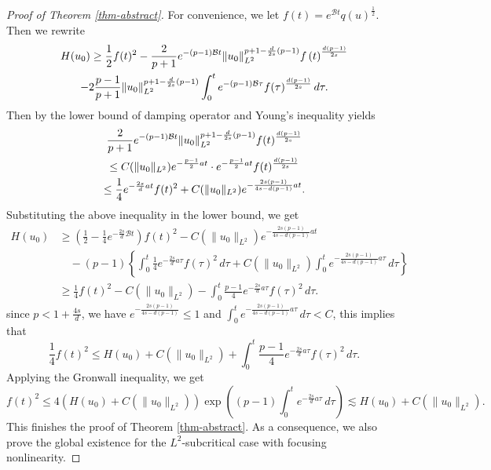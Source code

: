 \documentclass[10pt%
]{amsart}
\numberwithin{equation}{section}
\theoremstyle{definition}
\begin{document}
\begin{proof}[Proof of Theorem \ref{thm-abstract}]
	For convenience, we let $f(t)=e^{\mathcal Bt}q(u)^\frac{1}{2}$. Then we rewrite
	\begin{gather*}
		H(u_0) \geq \frac{1}{2} f(t)^2 - \frac{2}{p+1} e^{-(p-1)\mathcal Bt} \| u_0 \|_{L^2}^{p+1-\frac{d}{2s}(p-1)} f\left(t\right)^{\frac{d(p-1)}{2s}} \notag \\
		- 2\frac{p-1}{p+1} \| u_0 \|_{L^2}^{p+1-\frac{d}{2s}(p-1)} \int_0^t e^{-(p-1)\mathcal B\tau} f(\tau)^{\frac{d(p-1)}{2s}} \,d\tau.
	\end{gather*}
	Then by the lower bound of damping operator and  Young's inequality yields 
	\begin{gather*}
		\frac{2}{p+1} e^{-(p-1)\mathcal Bt} \|u_0\|_{L^2}^{p+1-\frac{d}{2s}(p-1)} f(t)^{\frac{d(p-1)}{2s}} \notag \\
		\leq C(\|u_0\|_{L^2}) e^{-\frac{p-1}{2}at} \cdot e^{-\frac{p-1}{2}at} f(t)^{\frac{d(p-1)}{2s}} \notag \\
		\leq \frac{1}{4} e^{-\frac{2s}{d}at} f(t)^2 + C(\|u_0\|_{L^2}) e^{-\frac{2s(p-1)}{4s-d(p-1)} at}.
	\end{gather*}
	Substituting the above inequality in the lower bound, we get
	\begin{align}
		H(u_0) &\geq \left( \frac{1}{2} - \frac{1}{4}e^{-\frac{2s}{d}\mathcal Bt} \right)f(t)^2 - C(\|u_0\|_{L^2})e^{-\frac{2s(p-1)}{4s-d(p-1)}at} \nonumber \\
		&\quad -(p-1)\left\{ \int_0^t \frac{1}{4}e^{-\frac{2s}{d}a \tau}f(\tau)^2\,d\tau + C(\|u_0\|_{L^2})\int_0^t e^{-\frac{2s(p-1)}{4s-d(p-1)}a\tau}\,d\tau \right\} \nonumber \\
		&\geq \frac{1}{4}f(t)^2 - C(\|u_0\|_{L^2}) - \int_0^t \frac{p-1}{4}e^{-\frac{2s}{d}a\tau}f(\tau)^2\,d\tau.
	\end{align}
	since $p<1+\frac{4s}{d}$, we have \( e^{-\frac{2s(p-1)}{4s-d(p-1)}} \leq 1 \) and \( \int_0^t e^{-\frac{2s(p-1)}{4s-d(p-1)}a\tau}\,d\tau < C \), this implies that
	\begin{equation}
		\frac{1}{4}f(t)^2 \leq H(u_0) + C(\|u_0\|_{L^2}) + \int_0^t \frac{p-1}{4}e^{-\frac{2s}{d}a\tau}f(\tau)^2\,d\tau.
	\end{equation}
	Applying the Gronwall inequality, we get
	\begin{equation}
		f(t)^2 \leq 4(H(u_0) + C(\|u_0\|_{L^2})) \exp\left((p-1)\int_0^t e^{-\frac{2s}{d}a\tau}\,d\tau\right) \lesssim H(u_0) + C(\|u_0\|_{L^2}).
	\end{equation}
	This finishes the proof of Theorem \ref{thm-abstract}. As a consequence, we also prove the global existence for the $L^2$-subcritical case with focusing nonlinearity. 


\end{proof}
\end{document}
